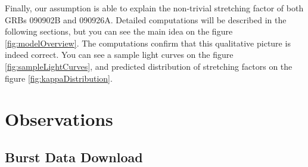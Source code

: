 \documentclass{article}
\begin{document}
Finally, our assumption is able to explain the non-trivial stretching factor of both GRBs 090902B and 090926A. Detailed computations will be described in the following sections, but you can see the main idea on the figure \ref{fig:modelOverview}. The computations confirm that this qualitative picture is indeed correct. You can see a sample light curves on the figure \ref{fig:sampleLightCurves}, and predicted distribution of stretching factors on the figure \ref{fig:kappaDistribution}.

\section{Observations}

\subsection{Burst Data Download}
\end{document}

